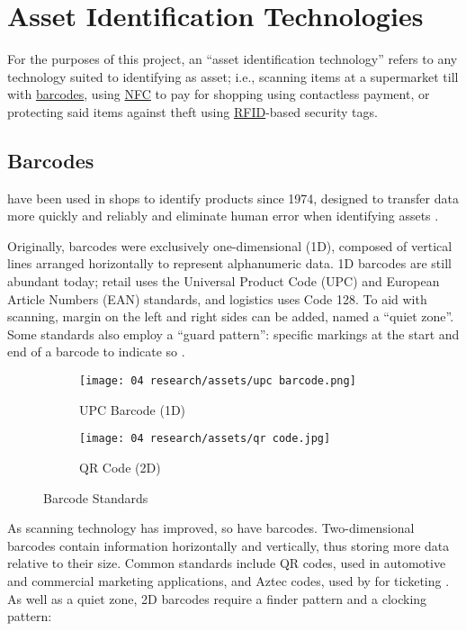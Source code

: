 \section{Asset Identification Technologies}

For the purposes of this project, an \enquote{asset
  identification technology} refers to any technology suited
to identifying as asset; i.e., scanning items at a
supermarket till with \hyperref[ss:barcodes]{barcodes},
using \hyperref[ss:nfc]{NFC} to pay for shopping using
contactless payment, or protecting said items against theft
using \hyperref[ss:rfid]{RFID}-based security tags.

\subsection{Barcodes} \label{ss:barcodes}

 have been used in shops to identify products
since 1974, designed to transfer data more quickly and
reliably and eliminate human error when identifying assets
\parencite{whatIsABarcode}.

Originally, barcodes were exclusively one-dimensional (1D),
composed of vertical lines arranged horizontally to
represent alphanumeric data.
1D barcodes are still abundant today; retail uses
the Universal Product Code (UPC) and European Article
Numbers (EAN) standards, and logistics uses Code 128.
To aid with scanning, margin on the left and right sides
can be added, named a \enquote{quiet zone}.
Some standards also employ a \enquote{guard pattern}:
specific markings at the start and end of a barcode to
indicate so \parencite{whatIsABarcode}.

\begin{figure}[H]
  \centering
  \begin{subfigure}{\subfigwidth}
    \centering
    \texttt{[image: 04
      research/assets/upc barcode.png]}
    \caption{UPC Barcode (1D)}
    \parencite{img:upcBarcode}
  \end{subfigure}
  \begin{subfigure}{\subfigwidth}
    \centering
    \texttt{[image: 04
      research/assets/qr code.jpg]}
    \caption{QR Code (2D)}
    \parencite{img:qrCode}
  \end{subfigure}
  \caption{Barcode Standards}
\end{figure}

As scanning technology has improved, so have barcodes.
Two-dimensional barcodes contain information horizontally
and vertically, thus storing more data relative to their
size.
Common standards include QR codes, used in automotive and
commercial marketing applications, and Aztec codes, used by
for ticketing \parencite{whatIsABarcode}.
As well as a quiet zone, 2D barcodes require a finder
pattern and a clocking pattern: 

